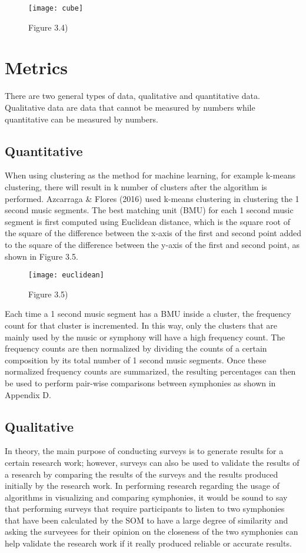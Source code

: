 \begin{figure}[h]
\caption{Figure 3.4)}
\centering
\texttt{[image: cube]}
\end{figure}

\section{Metrics}

There are two general types of data, qualitative and quantitative data. Qualitative data are data that cannot be measured by numbers while quantitative can be measured by numbers.

\subsection{Quantitative}

When using clustering as the method for machine learning, for example k-means clustering, there will result in k number of clusters after the algorithm is performed. Azcarraga \& Flores (2016) used k-means clustering in clustering the 1 second music segments. The best matching unit (BMU) for each 1 second music segment is first computed using Euclidean distance, which is the square root of the square of the difference between the x-axis of the first and second point added to the square of the difference between the y-axis of the first and second point, as shown in Figure 3.5.

\begin{figure}[h]
\caption{Figure 3.5)}
\centering
\texttt{[image: euclidean]}
\end{figure}

Each time a 1 second music segment has a BMU inside a cluster, the frequency count for that cluster is incremented. In this way, only the clusters that are mainly used by the music or symphony will have a high frequency count. The frequency counts are then normalized by dividing the counts of a certain composition by its total number of 1 second music segments. Once these normalized frequency counts are summarized, the resulting percentages can then be used to perform pair-wise comparisons between symphonies as shown in Appendix D.

\subsection{Qualitative}

In theory, the main purpose of conducting surveys is to generate results for a certain research work; however, surveys can also be used to validate the results of a research by comparing the results of the surveys and the results produced initially by the research work. In performing research regarding the usage of algorithms in visualizing and comparing symphonies, it would be sound to say that performing surveys that require participants to listen to two symphonies that have been calculated by the SOM to have a large degree of similarity and asking the surveyees for their opinion on the closeness of the two symphonies can help validate the research work if it really produced reliable or accurate results.

\nocite{Dubnov}
\nocite{Azcarraga2016}
\nocite{cambouropoulosEmilios}
\nocite{3dsom}
\nocite{correa}
\nocite{imogen}
\nocite{libin}
\nocite{foote}
\nocite{silla}
\nocite{mcfee}
\nocite{hepokoski}
